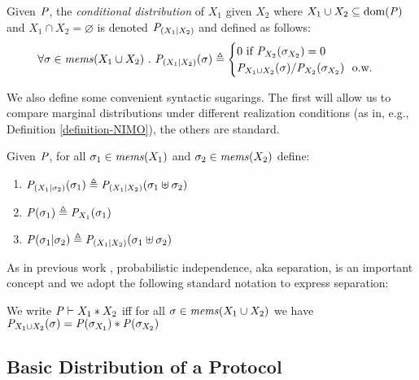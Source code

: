 \begin{definition}
  Given $\mathit{P}$, the \emph{conditional distribution}
  of $X_1$ given $X_2$ where $X_1 \cup X_2 \subseteq \mathrm{dom}(\mathit{P})$ and $X_1 \cap X_2 = \varnothing$
  is denoted $\mathit{P}_{({X_1}|{X_2})}$ and defined as follows:
  $$
  \forall \store \in \mems(X_1 \cup X_2)\ .\ 
  \condd{\pmf}{X_1}{X_2}(\store) \defeq
  \begin{cases}
    0 \text{\ if\ } \margd{\pmf}{X_2}(\store_{X_2}) = 0\\
    \margd{\pmf}{X_1 \cup X_2}(\store) / \margd{\pmf}{X_2}(\store_{X_2})\ \text{\ o.w.}
  \end{cases}
  $$
\end{definition}
We also define some convenient syntactic sugarings. The first will allow us to
compare marginal distributions under different realization conditions
(as in, e.g., Definition \ref{definition-NIMO}), the others are standard.
\begin{definition}
  Given $\mathit{P}$, for all $\sigma_1 \in \mathit{mems}(X_1)$ and $\sigma_2 \in \mathit{mems}(X_2)$ define:
  \begin{enumerate}
  \item $\mathit{P}_{({X_1}|{\sigma_2})}(\sigma_1) \triangleq \mathit{P}_{({X_1}|{X_2})}(\sigma_1 \uplus \sigma_2)$
  \item $\mathit{P}(\sigma_1)  \triangleq {\mathit{P}}_{X_1}(\sigma_1)$ 
  \item $\mathit{P}(\sigma_1|\sigma_2) \triangleq \mathit{P}_{({X_1}|{X_2})}(\sigma_1 \uplus \sigma_2)$
  \end{enumerate}
\end{definition}
As in previous work \cite{darais2019language,barthe2019probabilistic,skalka-near-ppdp24}, 
probabilistic independence, aka separation, is an important concept and we adopt the
following standard notation to express separation:
\begin{definition}
  We write $\mathit{P} \vdash X_1 * X_2$ iff for all
    $\sigma \in \mathit{mems}(X_1 \cup X_2)$ we have
  ${\mathit{P}}_{X_1 \cup X_2}(\sigma) =
  \mathit{P}(\sigma_{X_1}) * \mathit{P}(\sigma_{X_2})$
\end{definition}

\subsection{Basic Distribution of a Protocol}

